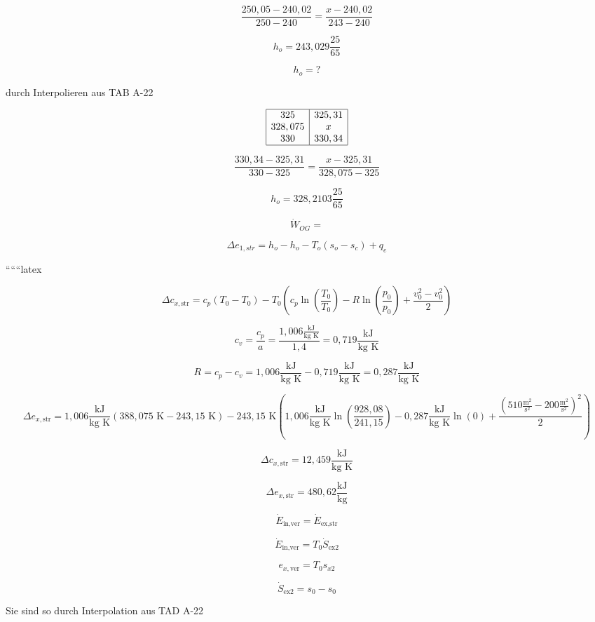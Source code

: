 \[
\frac{250,05 - 240,02}{250 - 240} = \frac{x - 240,02}{243 - 240}
\]

\[
h_o = 243,029 \frac{25}{65}
\]

\[
h_o = ?
\]

durch Interpolieren aus TAB A-22

\[
\begin{array}{|c|c|}
\hline
325 & 325,31 \\
328,075 & x \\
330 & 330,34 \\
\hline
\end{array}
\]

\[
\frac{330,34 - 325,31}{330 - 325} = \frac{x - 325,31}{328,075 - 325}
\]

\[
h_o = 328,2103 \frac{25}{65}
\]

\[
\dot{W}_{OG} = 
\]

\[
\Delta e_{1,str} = h_o - h_o - T_o (s_o - s_c) + q_e
\]

``````latex


\[
\Delta c_{x,\text{str}} = c_p \left( T_0 - T_0 \right) - T_0 \left( c_p \ln \left( \frac{T_0}{T_0} \right) - R \ln \left( \frac{p_0}{p_0} \right) + \frac{v_0^2 - v_0^2}{2} \right)
\]

\[
c_v = \frac{c_p}{a} = \frac{1,006 \frac{\text{kJ}}{\text{kg K}}}{1,4} = 0,719 \frac{\text{kJ}}{\text{kg K}}
\]

\[
R = c_p - c_v = 1,006 \frac{\text{kJ}}{\text{kg K}} - 0,719 \frac{\text{kJ}}{\text{kg K}} = 0,287 \frac{\text{kJ}}{\text{kg K}}
\]

\[
\Delta e_{x,\text{str}} = 1,006 \frac{\text{kJ}}{\text{kg K}} \left( 388,075 \text{ K} - 243,15 \text{ K} \right) - 243,15 \text{ K} \left( 1,006 \frac{\text{kJ}}{\text{kg K}} \ln \left( \frac{928,08}{241,15} \right) - 0,287 \frac{\text{kJ}}{\text{kg K}} \ln (0) + \frac{(510 \frac{\text{m}^2}{\text{s}^2} - 200 \frac{\text{m}^2}{\text{s}^2})^2}{2} \right)
\]

\[
\Delta c_{x,\text{str}} = 12,459 \frac{\text{kJ}}{\text{kg K}}
\]

\[
\Delta e_{x,\text{str}} = 480,62 \frac{\text{kJ}}{\text{kg}}
\]

\[
\dot{E}_{\text{in,ver}} = \dot{E}_{\text{ex,str}}
\]

\[
\dot{E}_{\text{in,ver}} = T_0 \dot{S}_{\text{ex2}}
\]

\[
e_{x,\text{ver}} = T_0 s_{x2}
\]

\[
\dot{S}_{\text{ex2}} = s_0 - s_0
\]

Sie sind so durch Interpolation aus TAD A-22

